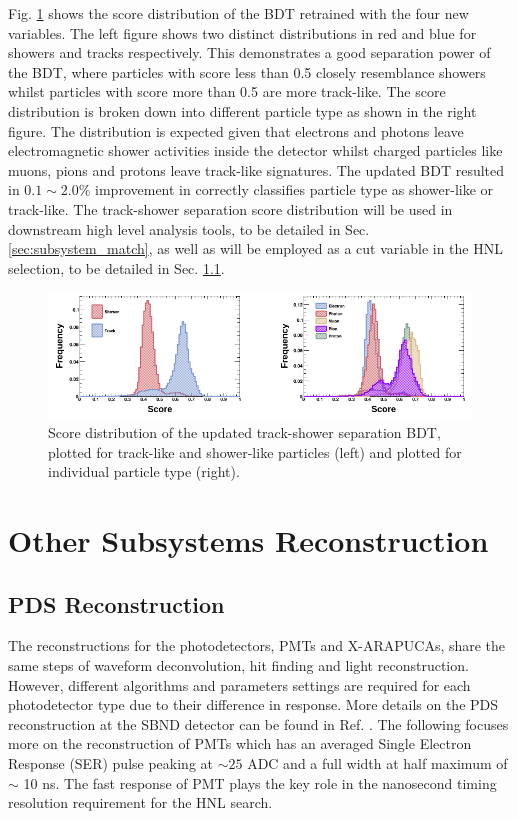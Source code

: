 Fig. \ref{fig:bdt_score} shows the score distribution of the BDT retrained with the four new variables.
The left figure shows two distinct distributions in red and blue for showers and tracks respectively.
This demonstrates a good separation power of the BDT, where particles with score less than 0.5 closely resemblance showers whilst particles with score more than 0.5 are more track-like.
The score distribution is broken down into different particle type as shown in the right figure.
The distribution is expected given that electrons and photons leave electromagnetic shower activities inside the detector whilst charged particles like muons, pions and protons leave track-like signatures. 
The updated BDT resulted in $0.1\sim2.0\%$ improvement in correctly classifies particle type as shower-like or track-like.
The track-shower separation score distribution will be used in downstream high level analysis tools, to be detailed in Sec. \ref{sec:subsystem_match}, as well as will be employed as a cut variable in the HNL selection, to be detailed in Sec. \ref{}.

\begin{figure}[htbp!]
        \centering
        \includegraphics[width=\textwidth]{bdt_score}
        \caption[bdt_score]{
	Score distribution of the updated track-shower separation BDT, plotted for track-like and shower-like particles (left) and plotted for individual particle type (right).
	}
        \label{fig:bdt_score}
\end{figure}

\section{Other Subsystems Reconstruction}
\label{sec:reco_others}

\subsection{PDS Reconstruction}

The reconstructions for the photodetectors, PMTs and X-ARAPUCAs, share the same steps of waveform deconvolution, hit finding and light reconstruction.
However, different algorithms and parameters settings are required for each photodetector type due to their difference in response.
More details on the PDS reconstruction at the SBND detector can be found in Ref. \cite{}.
The following focuses more on the reconstruction of PMTs which has an averaged Single Electron Response (SER) pulse peaking at $\sim 25$ ADC and a full width at half maximum of $\sim$ 10 ns.
The fast response of PMT plays the key role in the nanosecond timing resolution requirement for the HNL search.

